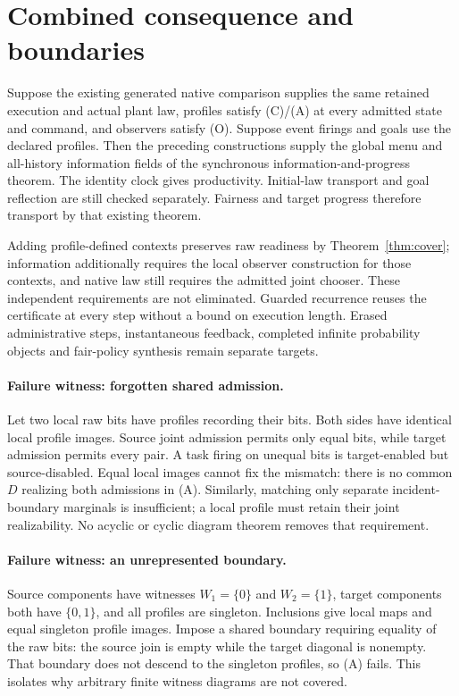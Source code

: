 \documentclass[11pt]{article}
\begin{document}
\section{Combined consequence and boundaries}
Suppose the existing generated native comparison supplies the same retained execution and actual plant law, profiles satisfy (C)/(A) at every admitted state and command, and observers satisfy (O). Suppose event firings and goals use the declared profiles. Then the preceding constructions supply the global menu and all-history information fields of the synchronous information-and-progress theorem. The identity clock gives productivity. Initial-law transport and goal reflection are still checked separately. Fairness and target progress therefore transport by that existing theorem.

Adding profile-defined contexts preserves raw readiness by Theorem~\ref{thm:cover}; information additionally requires the local observer construction for those contexts, and native law still requires the admitted joint chooser. These independent requirements are not eliminated. Guarded recurrence reuses the certificate at every step without a bound on execution length. Erased administrative steps, instantaneous feedback, completed infinite probability objects and fair-policy synthesis remain separate targets.

\paragraph{Failure witness: forgotten shared admission.} Let two local raw bits have profiles recording their bits. Both sides have identical local profile images. Source joint admission permits only equal bits, while target admission permits every pair. A task firing on unequal bits is target-enabled but source-disabled. Equal local images cannot fix the mismatch: there is no common $D$ realizing both admissions in (A). Similarly, matching only separate incident-boundary marginals is insufficient; a local profile must retain their joint realizability. No acyclic or cyclic diagram theorem removes that requirement.

\paragraph{Failure witness: an unrepresented boundary.} Source components have witnesses $W_1=\{0\}$ and $W_2=\{1\}$, target components both have $\{0,1\}$, and all profiles are singleton. Inclusions give local maps and equal singleton profile images. Impose a shared boundary requiring equality of the raw bits: the source join is empty while the target diagonal is nonempty. That boundary does not descend to the singleton profiles, so (A) fails. This isolates why arbitrary finite witness diagrams are not covered.
\end{document}
